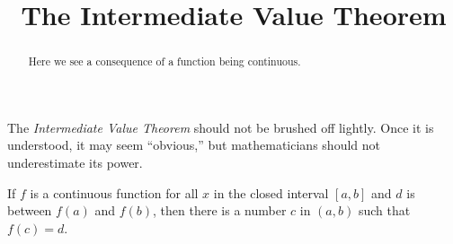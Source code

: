 \documentclass{ximera}
\title[Dig-In:]{The Intermediate Value Theorem}
\begin{document}
\begin{abstract}
  Here we see a consequence of a function being continuous.
\end{abstract}
\maketitle



The \textit{Intermediate Value Theorem} should not be brushed off
lightly. Once it is understood, it may seem ``obvious,'' but
mathematicians should not underestimate its power.

\begin{theorem}\label{theorem:IVT}
If $f$ is a continuous function for all $x$ in the closed interval
$[a,b]$ and $d$ is between $f(a)$ and $f(b)$, then there is a number
$c$ in $(a, b)$ such that $f(c) = d$.
\end{theorem}

\end{document}
